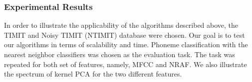 \documentclass[12pt,letterpaper,doublespaced,ETD,dvips,proposal]{gtthesis}
\begin{document}
\begin{Body}
%


\subsubsection{Experimental Results} In order to illustrate the
applicability of the algorithms described above, the TIMIT and Noisy
TIMIT (NTIMIT) database were chosen. Our goal is to test our
algorithms in terms of scalability and time. Phoneme classification
with the nearest neighbor classifiers was chosen as the evaluation
task. The task was repeated for both set of features, namely, MFCC
and NRAF. We also illustrate the spectrum of kernel PCA for the two
different features.


\end{Body}
\end{document}
